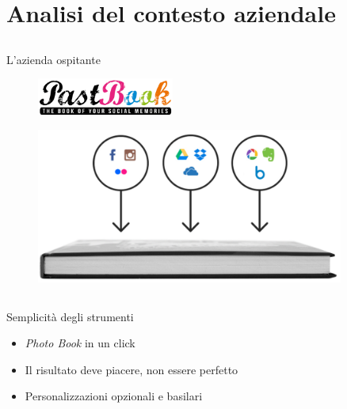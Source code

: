 \section{Analisi del contesto aziendale}
	\subsection{}
		\begin{frame}{L'azienda ospitante}
			\begin{figure}[H]
				\centering
				\includegraphics[width=0.4\textwidth]{capitolo_1/immagini/logo_pastbook.png}
			\end{figure}
			\begin{figure}[H]
				\centering
				\includegraphics[width=0.9\textwidth]{capitolo_1/immagini/photo_book_one_click.png}
			\end{figure}
		\end{frame}
	\subsection{}
		\begin{frame}{Semplicità degli strumenti}
			\begin{itemize}
				\item \emph{Photo Book} in un click
				\item Il risultato deve piacere, non essere perfetto
				\item Personalizzazioni opzionali e basilari
			\end{itemize}
			
		\end{frame}
